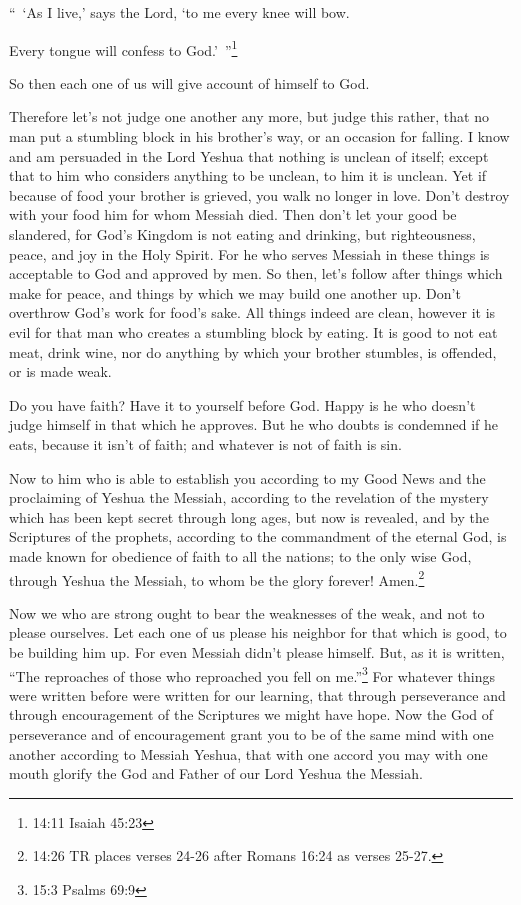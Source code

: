“ ‘As I live,’ says the Lord, ‘to me every knee will bow.

Every tongue will confess to God.’ ”\footnote{14:11 Isaiah 45:23}

\myverse{}So then each one of us will give account of himself to God.

\myverse{}Therefore let’s not judge one another any more, but judge this
rather, that no man put a stumbling block in his brother’s way, or an occasion for falling.
\myverse{}I know and am persuaded in the Lord Yeshua that nothing is unclean of itself;
except that to him who considers anything to be unclean, to him it is unclean.
\myverse{}Yet if because of food your brother is grieved, you walk no longer in love.
Don’t destroy with your food him for whom Messiah died.
\myverse{}Then don’t let your good be slandered,
\myverse{}for God’s Kingdom is not eating and drinking, but righteousness, peace, and
joy in the Holy Spirit.
\myverse{}For he who serves Messiah in these things is acceptable to God and approved
by men.
\myverse{}So then, let’s follow after things which make for peace, and things by which
we may build one another up.
\myverse{}Don’t overthrow God’s work for food’s sake. All things indeed are clean,
however it is evil for that man who creates a stumbling block by eating.
\myverse{}It is good to not eat meat, drink wine, nor do anything by which your brother
stumbles, is offended, or is made weak.

\myverse{}Do you have faith? Have it to yourself before God. Happy is
he who doesn’t judge himself in that which he approves.
\myverse{}But he who doubts is condemned if he eats, because it isn’t of faith; and
whatever is not of faith is sin.

\myverse{}Now to him who is able to establish you according to my Good
News and the proclaiming of Yeshua the Messiah, according to the revelation of the mystery which has been
kept secret through long ages,
\myverse{}but now is revealed, and by the Scriptures of the prophets, according to
the commandment of the eternal God, is made known for obedience of faith to all the nations;
\myverse{}to the only wise God, through Yeshua the Messiah, to whom be the glory forever!
Amen.\footnote{14:26 TR places verses 24-26 after
	Romans 16:24 as verses 25-27.
}


\mychapter{} \myverse*{}Now we who are strong ought to bear the weaknesses of the weak,
and not to please ourselves.
\myverse{}Let each one of us please his neighbor for that which is good, to be building
him up.
\myverse{}For even Messiah didn’t please himself. But, as it is written, “The reproaches
of those who reproached you fell on me.”\footnote{15:3 Psalms 69:9}
\myverse{}For whatever things were written before were written for our learning, that
through perseverance and through encouragement of the Scriptures we might have hope.
\myverse{}Now the God of perseverance and of encouragement grant you to be of the same
mind with one another according to Messiah Yeshua,
\myverse{}that with one accord you may with one mouth glorify the God and Father of our
Lord Yeshua the Messiah.

